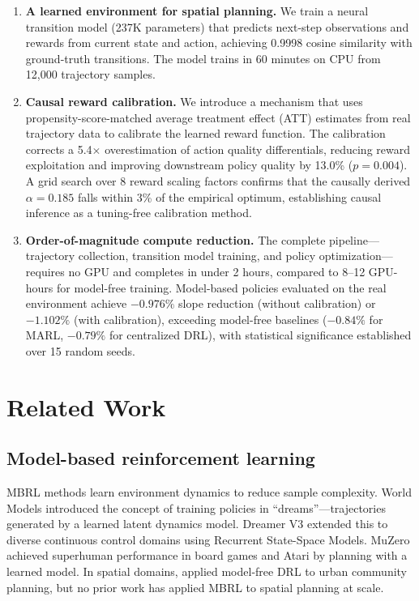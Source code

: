 \documentclass[11pt]{article}
\begin{document}
\begin{enumerate}
\item \textbf{A learned environment for spatial planning.} We train a neural transition model (237K parameters) that predicts next-step observations and rewards from current state and action, achieving 0.9998 cosine similarity with ground-truth transitions. The model trains in 60 minutes on CPU from 12{,}000 trajectory samples.

\item \textbf{Causal reward calibration.} We introduce a mechanism that uses propensity-score-matched average treatment effect (ATT) estimates from real trajectory data to calibrate the learned reward function. The calibration corrects a 5.4$\times$ overestimation of action quality differentials, reducing reward exploitation and improving downstream policy quality by 13.0\% ($p = 0.004$). A grid search over 8 reward scaling factors confirms that the causally derived $\alpha = 0.185$ falls within 3\% of the empirical optimum, establishing causal inference as a tuning-free calibration method.

\item \textbf{Order-of-magnitude compute reduction.} The complete pipeline---trajectory collection, transition model training, and policy optimization---requires no GPU and completes in under 2 hours, compared to 8--12 GPU-hours for model-free training. Model-based policies evaluated on the real environment achieve $-0.976\%$ slope reduction (without calibration) or $-1.102\%$ (with calibration), exceeding model-free baselines ($-0.84\%$ for MARL, $-0.79\%$ for centralized DRL), with statistical significance established over 15 random seeds.
\end{enumerate}


\section{Related Work}
\label{sec:related}

\subsection{Model-based reinforcement learning}

MBRL methods learn environment dynamics to reduce sample complexity. World Models \citep{ha2018world} introduced the concept of training policies in ``dreams''---trajectories generated by a learned latent dynamics model. Dreamer V3 \citep{hafner2023dreamerv3} extended this to diverse continuous control domains using Recurrent State-Space Models. MuZero \citep{schrittwieser2020muzero} achieved superhuman performance in board games and Atari by planning with a learned model. In spatial domains, \citet{zheng2023spatial} applied model-free DRL to urban community planning, but no prior work has applied MBRL to spatial planning at scale.
\end{document}
